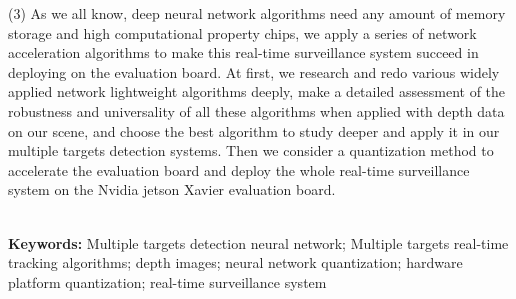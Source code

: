(3) As we all know, deep neural network algorithms need any amount of memory storage and high computational property chips, 
we apply a series of network acceleration algorithms to make this real-time surveillance system succeed in deploying on the evaluation board. 
At first, we research and redo various widely applied network lightweight algorithms deeply, make a detailed assessment of the 
robustness and universality of all these algorithms when applied with depth data on our scene, and choose the best algorithm to study 
deeper and apply it in our multiple targets detection systems. Then we consider a quantization method to accelerate the evaluation board and 
deploy the whole real-time surveillance system on the Nvidia jetson Xavier evaluation board.

 \ \\
\textbf{Keywords: }Multiple targets detection neural network; Multiple targets real-time tracking algorithms; depth images; neural network quantization; hardware platform quantization; real-time surveillance system 



